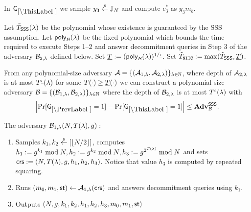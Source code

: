 %


In $\games_\thisgame$ we sample $y_3 \stackrel{{\scriptscriptstyle\$}}{\leftarrow} \mathbb{J}_N$ and compute $c_3^*$ as $y_3 m_b$.

Let $\tilde{T}_\mathsf{SSS}(\lambda)$ be the polynomial whose existence is guaranteed by the SSS assumption.
Let $\mathsf{poly}_{\mathcal{B}}(\lambda)$ be the fixed polynomial which bounds the time required to execute Steps 1--2 and answer decommitment queries in Step 3 of the adversary $\mathcal{B}_{2, \lambda}$ defined below. Set $\underline{T} := (\mathsf{poly}_{\mathcal{B}}(\lambda))^{1 / \underline{\epsilon}}$.  Set $\tilde{T}_{\mathtt{NITC}} := \max(\tilde{T}_\mathsf{SSS}, \underline{T})$.
\begin{lemma}
From any polynomial-size adversary $\mathcal{A} = \{(\mathcal{A}_{1,\lambda}, \mathcal{A}_{2, \lambda})\}_{\lambda \in \mathbb{N}}$, where depth of $\mathcal{A}_{2, \lambda}$ is at most $T^{\underline{\epsilon}}(\lambda)$ for some $T(\cdot) \geq \underline{T}(\cdot)$ we can construct a polynomial-size adversary $\mathcal{B} = \{(\mathcal{B}_{1,\lambda}, \mathcal{B}_{2, \lambda})\}_{\lambda \in \mathbb{N}}$ where the depth of $\mathcal{B}_{2, \lambda}$ is at most $T^{\epsilon}(\lambda)$ with
\[
\left|\Pr[\games_\prevgame = 1] - \Pr[\games_\thisgame = 1]\right| \leq \advtg_\advB^\sss.
\]
\end{lemma}

The adversary $\mathcal{B}_{1,\lambda}(N, T(\lambda), g):$
\vspace{-2mm}
\begin{enumerate}
\item Samples $k_1, k_2 \stackrel{{\scriptscriptstyle\$}}{\leftarrow} [\left\lfloor N/2 \right\rfloor]$, computes $h_1 := g^{k_1} \bmod N, h_2 := g^{k_2} \bmod N,  h_3 := g^{2^{T(\lambda)}} \bmod N$ and sets $\mathsf{crs}:=(N, T(\lambda), g, h_1, h_2, h_3)$. Notice that value $h_3$ is computed by repeated squaring.
\item Runs $(m_0, m_1, \mathsf{st}) \leftarrow \mathcal{A}_{1, \lambda}(\mathsf{crs})$ and answers decommitment queries using $k_1$.
\item Outputs $(N,g,k_1, k_2, h_1,h_2,h_3, m_0, m_1, \mathsf{st})$
\end{enumerate}

